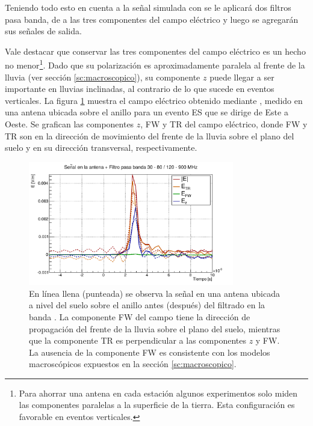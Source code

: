 	Teniendo todo esto en cuenta a la se\~nal simulada con \zhs{} se le aplicar\'a dos filtros pasa banda, de  a las tres componentes del campo el\'ectrico y luego se agregar\'an sus se\~nales de salida.
	
	Vale destacar que conservar las tres componentes del campo el\'ectrico es un hecho no menor\footnote{Para ahorrar una antena en cada estaci\'on algunos experimentos solo miden las componentes paralelas a la superficie de la tierra. Esta configuraci\'on es favorable en eventos verticales.}.
	Dado que su polarizaci\'on es aproximadamente paralela al frente de la lluvia (ver secci\'on \ref{sc:macroscopico}), su componente $z$ puede llegar a ser importante en lluvias inclinadas, al contrario de lo que sucede en eventos verticales.
	La figura \ref{fig:antSig} muestra el campo el\'ectrico obtenido mediante \zhs{}, medido en una antena ubicada sobre el anillo \cher{} para un evento ES que se dirige de Este a Oeste.
	Se grafican las componentes $z$, FW y TR del campo eléctrico, donde FW y TR son en la direcci\'on de movimiento del frente de la lluvia sobre el plano del suelo y en su direcci\'on transversal, respectivamente.
	
	\begin{figure}[ht!]
		\centering
		\includegraphics[width=0.8\textwidth]{./fig/simulacionRadio/antennaFilt}
		\caption{\label{fig:antSig}
		En l\'inea llena (punteada) se observa la señal en una antena ubicada a nivel del suelo sobre el anillo \cher{} antes (despu\'es) del filtrado en la banda .  
		La componente FW del campo tiene la direcci\'on de propagaci\'on del frente de la lluvia sobre el plano del suelo, mientras que la componente TR es perpendicular a las componentes $z$ y FW.
		La ausencia de la componente FW es consistente con los modelos macrosc\'opicos expuestos en la secci\'on \ref{sc:macroscopico}.
		}
	\end{figure}
	
